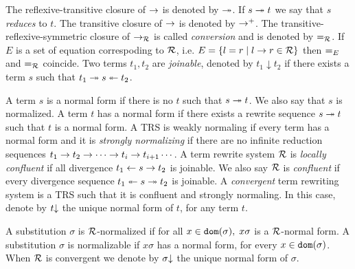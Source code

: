 The reflexive-transitive closure of $\rightarrow$ is denoted by $\twoheadrightarrow$. If $s \twoheadrightarrow t$ we say that $s$ \textit{reduces} to $t$. The transitive closure of $\rightarrow$ is denoted by $\rightarrow^+$. The transitive-reflexive-symmetric closure of $\rightarrow_{\mathcal{R}}$ is called \textit{conversion} and is denoted by $\eqUnif{\trs}$. If $E$ is a set of equation correspoding to $\mathcal{R}$, i.e. $E = \{ l = r \mid l \rightarrow r \in \mathcal{R} \}$ then $\eqUnif{E}$ and $\eqUnif{\trs}$ coincide. Two terms $t_1, t_2$ are \textit{joinable}, denoted by $t_1 \downarrow t_2$ if there exists a term $s$ such that $t_1 \twoheadrightarrow s \twoheadleftarrow t_2$.

A term $s$ is a normal form if there is no $t$ such that $s \twoheadrightarrow t$. We also say that $s$ is normalized. A term $t$ has a normal form if there exists a rewrite sequence $s \twoheadrightarrow t$ such that $t$ is a normal form. A TRS is weakly normaling if every term has a normal form and it is \textit{strongly normalizing} if there are no infinite reduction sequences $t_1 \rightarrow t_2 \rightarrow \cdots \rightarrow t_i \rightarrow t_{i+1} \cdots$. A term rewrite system $\mathcal{R}$ is \textit{locally confluent} if all divergence $t_1 \leftarrow s \rightarrow t_2$ is joinable. We also say $\mathcal{R}$ is \textit{confluent} if every divergence sequence $t_1 \twoheadleftarrow s \twoheadrightarrow t_2$ is joinable. A \textit{convergent} term rewriting system is a TRS such that it is confluent and strongly normaling. In this case, denote by $t\mathord{\downarrow}$ the unique normal form of $t$, for any term $t$.

A substitution $\sigma$ is $\mathcal{R}$-normalized if for all $x \in \mathtt{dom}(\sigma), \; x \sigma$ is a $\mathcal{R}$-normal form. A substitution $\sigma$ is normalizable if $x \sigma$ has a normal form, for every $x \in \mathtt{dom}(\sigma)$. When $\mathcal{R}$ is convergent we denote by $\sigma\mathord{\downarrow}$ the unique normal form of $\sigma$.
